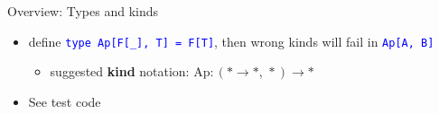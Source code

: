\documentclass[english]{beamer}
\begin{document}
\begin{frame}{Overview: Types and kinds}
\begin{itemize}
\begin{itemize}
and the \texttt{\textcolor{blue}{\footnotesize{}T}} are types of different
\textbf{kinds} ($*\rightarrow*$ and $*$ resp.)
\item define \texttt{\textcolor{blue}{\footnotesize{}type Ap{[}F{[}\_{]},
T{]} = F{[}T{]}}}, then wrong kinds will fail in \texttt{\textcolor{blue}{\footnotesize{}Ap{[}A,
B{]}}}{\footnotesize \par}
\begin{itemize}
\item suggested \textbf{kind} notation:{\footnotesize{} $\text{Ap}:(*\rightarrow*,\,*)\rightarrow*$}{\footnotesize \par}
\end{itemize}
\item See test code
\end{itemize}
\end{itemize}
\end{frame}
\end{document}
